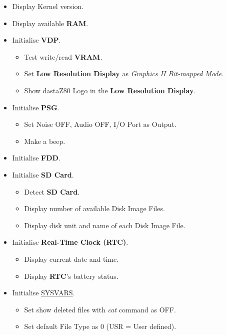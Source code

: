 \begin{itemize}
\begin{itemize}
            \item Display Kernel version.
            \item Display available \textbf{RAM}.
            \item Initialise \textbf{VDP}.
            \begin{itemize}
                \item Test write/read \textbf{VRAM}.
                \item Set \textbf{Low Resolution Display} as \textit{Graphics II
                Bit-mapped Mode}.
                \item Show dastaZ80 Logo in the \textbf{Low Resolution Display}.
            \end{itemize}
            \item Initialise \textbf{PSG}.
            \begin{itemize}
                \item Set Noise OFF, Audio OFF, I/O Port as Output.
                \item Make a beep.
            \end{itemize}
            \item Initialise \textbf{FDD}.
            \item Initialise \textbf{SD Card}.
            \begin{itemize}
                \item Detect \textbf{SD Card}.
                \item Display number of available Disk Image Files.
                \item Display disk unit and name of each Disk Image File.
            \end{itemize}
            \item Initialise \textbf{Real-Time Clock (RTC)}.
            \begin{itemize}
                \item Display current date and time.
                \item Display \textbf{RTC}'s battery status.
            \end{itemize}
            \item Initialise \hyperref[sec:ram_memmap]{SYSVARS}.
            \begin{itemize}
                \item Set show deleted files with \textit{cat} command as OFF.
                \item Set default File Type as 0 (USR = User defined).

\end{itemize}
\end{itemize}
\end{itemize}
